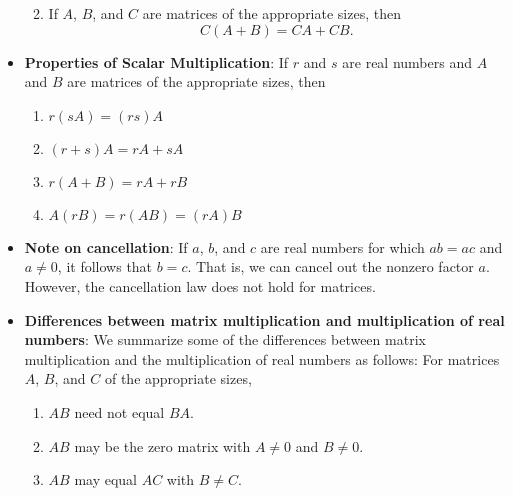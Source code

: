 \documentclass{report}
\begin{document}
\begin{itemize}
\begin{enumerate}
\[                    \]
                \item If \( A \), \( B \), and \( C \) are matrices of the appropriate sizes, then 
                    \[
                        C(A + B) = CA + CB.
                    \]
            \end{enumerate}
        \item \textbf{Properties of Scalar Multiplication}:
            If \( r \) and \( s \) are real numbers and \( A \) and \( B \) are matrices of the appropriate sizes, then
            \begin{enumerate}
                \item \( r(sA) = (rs)A \)
                \item \( (r + s)A = rA + sA \)
                \item \( r(A + B) = rA + rB \)
                \item \( A(rB) = r(AB) = (rA)B \)
            \end{enumerate}
        \item \textbf{Note on cancellation}: If \( a \), \( b \), and \( c \) are real numbers for which \( ab = ac \) and \( a \neq 0 \), it follows that \( b = c \). That is, we can cancel out the nonzero factor \( a \). However, the cancellation law does not hold for matrices. 
        \item \textbf{Differences between matrix multiplication and multiplication of real numbers}:
            We summarize some of the differences between matrix multiplication and the multiplication of real numbers as follows: For matrices \( A \), \( B \), and \( C \) of the appropriate sizes,
            \begin{enumerate}
                \item \( AB \) need not equal \( BA \).
                \item \( AB \) may be the zero matrix with \( A \neq 0 \) and \( B \neq 0 \).
                \item \( AB \) may equal \( AC \) with \( B \neq C \).
            \end{enumerate}
    \end{itemize}
\end{document}
